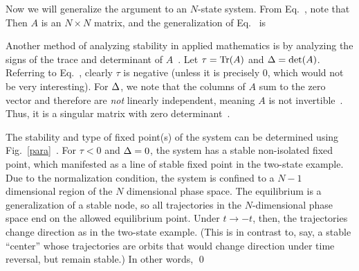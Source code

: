 {	Now we will generalize the argument to an $N$-state system.  From Eq.~, note that
	Then $A$ is an $N \times N$ matrix,
	and the generalization of Eq.~ is
	
	Another method of analyzing stability in applied mathematics is by analyzing the signs of the trace and determinant of $A$~\cite[pp.~136--137]{Strogatz}.  Let $\tau = \Tr(A)$ and $\Delta = \det(A)$.  Referring to Eq.~, clearly $\tau$ is negative (unless it is precisely 0, which would not be very interesting).  For $\Delta$, we note that the columns of $A$ sum to the zero vector and therefore are \emph{not} linearly independent, meaning $A$ is not invertible~\cite{Invertible}.  Thus, it is a singular matrix with zero determinant~\cite{Singular}.
	
	The stability and type of fixed point(s) of the system can be determined using Fig.~\ref{para}~\cite[p.~137]{Strogatz}.  For $\tau < 0$ and $\Delta = 0$, the system has a stable non-isolated fixed point, which manifested as a line of stable fixed point in the two-state example.  Due to the normalization condition, the system is confined to a $N - 1$ dimensional region of the $N$ dimensional phase space.  The equilibrium is a generalization of a stable node, so all trajectories in the $N$-dimensional phase space end on the allowed equilibrium point.  Under $t \to -t$, then, the trajectories change direction as in the two-state example.  (This is in contrast to, say, a stable ``center'' whose trajectories are orbits that would change direction under time reversal, but remain stable.)  In other words,  \qed
	
}
